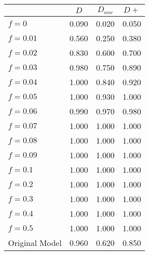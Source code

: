 \begin{tabular}{lccc}
\toprule
 & $D$ & $D_{anc}$ & $D+$ \\
\midrule
$f = 0$ & 0.090 & 0.020 & 0.050 \\
$f = 0.01$ & 0.560 & 0.250 & 0.380 \\
$f = 0.02$ & 0.830 & 0.600 & 0.700 \\
$f = 0.03$ & 0.980 & 0.750 & 0.890 \\
$f = 0.04$ & 1.000 & 0.840 & 0.920 \\
$f = 0.05$ & 1.000 & 0.930 & 1.000 \\
$f = 0.06$ & 0.990 & 0.970 & 0.980 \\
$f = 0.07$ & 1.000 & 1.000 & 1.000 \\
$f = 0.08$ & 1.000 & 1.000 & 1.000 \\
$f = 0.09$ & 1.000 & 1.000 & 1.000 \\
$f = 0.1$ & 1.000 & 1.000 & 1.000 \\
$f = 0.2$ & 1.000 & 1.000 & 1.000 \\
$f = 0.3$ & 1.000 & 1.000 & 1.000 \\
$f = 0.4$ & 1.000 & 1.000 & 1.000 \\
$f = 0.5$ & 1.000 & 1.000 & 1.000 \\
Original Model & 0.960 & 0.620 & 0.850 \\
\bottomrule
\end{tabular}
